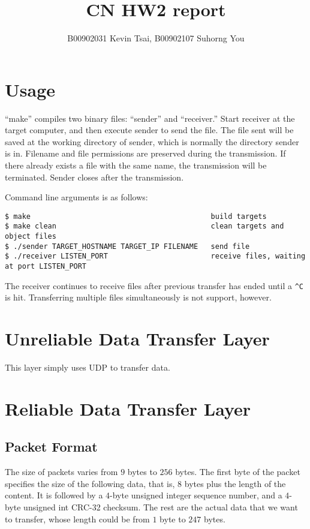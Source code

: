 \documentclass[10pt,a4paper]{article}
\author{B00902031 Kevin Tsai, B00902107 Suhorng You}
\title{CN HW2 report}
\begin{document}
\maketitle

\section{Usage}
    ``make'' compiles two binary files: ``sender'' and ``receiver.'' Start receiver at the target computer, and then execute sender to send the file. The file sent will be saved at the working directory of sender, which is normally the directory sender is in. Filename and file permissions are preserved during the transmission. If there already exists a file with the same name, the transmission will be terminated. Sender closes after the transmission.

    Command line arguments is as follows:
\begin{verbatim}
$ make											build targets
$ make clean									clean targets and object files
$ ./sender TARGET_HOSTNAME TARGET_IP FILENAME	send file
$ ./receiver LISTEN_PORT						receive files, waiting at port LISTEN_PORT
\end{verbatim}

    The receiver continues to receive files after previous transfer has ended until a \texttt{\^{}C} is hit. Transferring multiple files simultaneously is not support, however.
\section{Unreliable Data Transfer Layer}
    This layer simply uses UDP to transfer data.
\section{Reliable Data Transfer Layer}
\subsection{Packet Format}
    The size of packets varies from $9$ bytes to $256$ bytes. The first byte of the packet specifies the size of the following data, that is, $8$ bytes plus the length of the content. It is followed by a $4$-byte unsigned integer sequence number, and a $4$-byte unsigned int CRC-32 checksum. The rest are the actual data that we want to transfer, whose length could be from $1$ byte to $247$ bytes.
\end{document}
